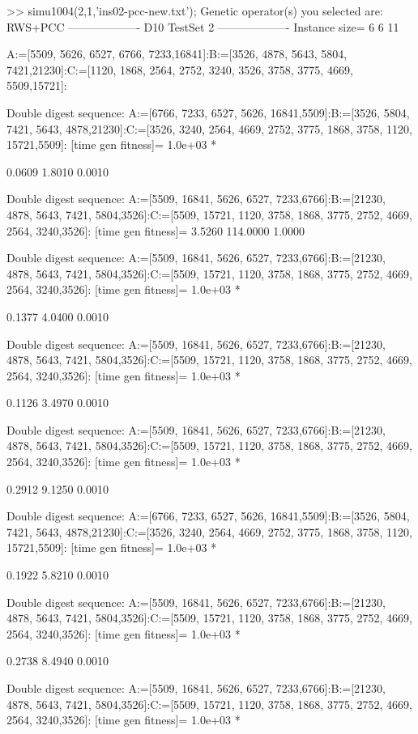 >> simu1004(2,1,'ins02-pcc-new.txt');
Genetic operator(s) you selected are:
RWS+PCC
------------------- D10 TestSet 2 -------------------
Instance size=
     6     6    11

A:=[5509, 5626, 6527, 6766, 7233,16841]:B:=[3526, 4878, 5643, 5804, 7421,21230]:C:=[1120, 1868, 2564, 2752, 3240, 3526, 3758, 3775, 4669, 5509,15721]:

Double digest sequence:
A:=[6766, 7233, 6527, 5626, 16841,5509]:B:=[3526, 5804, 7421, 5643, 4878,21230]:C:=[3526, 3240, 2564, 4669, 2752, 3775, 1868, 3758, 1120, 15721,5509]:
[time gen fitness]=
   1.0e+03 *

    0.0609    1.8010    0.0010

Double digest sequence:
A:=[5509, 16841, 5626, 6527, 7233,6766]:B:=[21230, 4878, 5643, 7421, 5804,3526]:C:=[5509, 15721, 1120, 3758, 1868, 3775, 2752, 4669, 2564, 3240,3526]:
[time gen fitness]=
    3.5260  114.0000    1.0000

Double digest sequence:
A:=[5509, 16841, 5626, 6527, 7233,6766]:B:=[21230, 4878, 5643, 7421, 5804,3526]:C:=[5509, 15721, 1120, 3758, 1868, 3775, 2752, 4669, 2564, 3240,3526]:
[time gen fitness]=
   1.0e+03 *

    0.1377    4.0400    0.0010

Double digest sequence:
A:=[5509, 16841, 5626, 6527, 7233,6766]:B:=[21230, 4878, 5643, 7421, 5804,3526]:C:=[5509, 15721, 1120, 3758, 1868, 3775, 2752, 4669, 2564, 3240,3526]:
[time gen fitness]=
   1.0e+03 *

    0.1126    3.4970    0.0010

Double digest sequence:
A:=[5509, 16841, 5626, 6527, 7233,6766]:B:=[21230, 4878, 5643, 7421, 5804,3526]:C:=[5509, 15721, 1120, 3758, 1868, 3775, 2752, 4669, 2564, 3240,3526]:
[time gen fitness]=
   1.0e+03 *

    0.2912    9.1250    0.0010

Double digest sequence:
A:=[6766, 7233, 6527, 5626, 16841,5509]:B:=[3526, 5804, 7421, 5643, 4878,21230]:C:=[3526, 3240, 2564, 4669, 2752, 3775, 1868, 3758, 1120, 15721,5509]:
[time gen fitness]=
   1.0e+03 *

    0.1922    5.8210    0.0010

Double digest sequence:
A:=[5509, 16841, 5626, 6527, 7233,6766]:B:=[21230, 4878, 5643, 7421, 5804,3526]:C:=[5509, 15721, 1120, 3758, 1868, 3775, 2752, 4669, 2564, 3240,3526]:
[time gen fitness]=
   1.0e+03 *

    0.2738    8.4940    0.0010

Double digest sequence:
A:=[5509, 16841, 5626, 6527, 7233,6766]:B:=[21230, 4878, 5643, 7421, 5804,3526]:C:=[5509, 15721, 1120, 3758, 1868, 3775, 2752, 4669, 2564, 3240,3526]:
[time gen fitness]=
   1.0e+03 *

